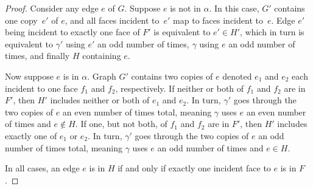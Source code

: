 \documentclass[letterpaper,review]{siamart190516}
\def\snip{\mathbin{\raisebox{0.15ex}{\rotatebox[origin=c]{60}{\Rightscissors}\!}}}
\def\snip{\mathbin{\backslash\!\!\backslash}}
\def\subsnip{\mathbin{\raisebox{0.15ex}{\rotatebox[origin=c]{60}{\footnotesize\Rightscissors}\!}}}
\def\Gsnip{\mathord{G_{\subsnip}}}
\def\gammasnip{\mathord{\gamma_{\subsnip}}}
\def\Gsnip{G'}
\def\Fsnip{F'}
\def\gammasnip{\gamma'}
\def\Hsnip{H'}
\begin{document}
{\begin{proof}
Consider any edge $e$ of $G$.
Suppose $e$ is not in $\alpha$.
In this case, $\Gsnip$ contains one copy~$e'$ of $e$, and all faces incident to~$e'$ map to faces
incident to~$e$.
Edge $e'$ being incident to exactly one face of $\Fsnip$ is equivalent to $e' \in H'$, which in turn
is equivalent to $\gammasnip$ using $e'$ an odd number of times, $\gamma$ using $e$ an odd number of
times, and finally $H$ containing $e$.

Now suppose $e$ is in $\alpha$.
Graph $\Gsnip$ contains two copies of $e$ denoted $e_1$ and $e_2$ each incident to one face $f_1$
and $f_2$, respectively.
If neither or both of $f_1$ and $f_2$ are in $\Fsnip$, then $\Hsnip$ includes neither or both of
$e_1$ and $e_2$.
In turn, $\gammasnip$ goes through the two copies of $e$ an even number of times total, meaning
$\gamma$ uses $e$ an even number of times and $e \notin H$.
If one, but not both, of $f_1$ and $f_2$ are in $\Fsnip$, then $\Hsnip$ includes exactly one of
$e_1$ or $e_2$.
In turn, $\gammasnip$ goes through the two copies of $e$ an odd number of times total, meaning
$\gamma$ uses $e$ an odd number of times and $e \in H$.

In all cases, an edge $e$ is in $H$ if and only if exactly one incident face to $e$ is in $F$.
\end{proof}

}
\end{document}
